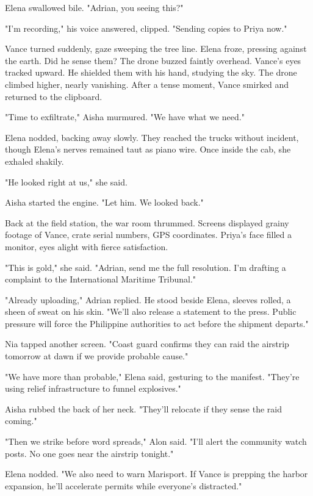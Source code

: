 Elena swallowed bile. "Adrian, you seeing this?"

"I'm recording," his voice answered, clipped. "Sending copies to Priya now."

Vance turned suddenly, gaze sweeping the tree line. Elena froze, pressing against the earth. Did he sense them? The drone buzzed faintly overhead. Vance's eyes tracked upward. He shielded them with his hand, studying the sky. The drone climbed higher, nearly vanishing. After a tense moment, Vance smirked and returned to the clipboard.

"Time to exfiltrate," Aisha murmured. "We have what we need."

Elena nodded, backing away slowly. They reached the trucks without incident, though Elena's nerves remained taut as piano wire. Once inside the cab, she exhaled shakily.

"He looked right at us," she said.

Aisha started the engine. "Let him. We looked back."

\bigskip

Back at the field station, the war room thrummed. Screens displayed grainy footage of Vance, crate serial numbers, GPS coordinates. Priya's face filled a monitor, eyes alight with fierce satisfaction.

"This is gold," she said. "Adrian, send me the full resolution. I'm drafting a complaint to the International Maritime Tribunal."

"Already uploading," Adrian replied. He stood beside Elena, sleeves rolled, a sheen of sweat on his skin. "We'll also release a statement to the press. Public pressure will force the Philippine authorities to act before the shipment departs."

Nia tapped another screen. "Coast guard confirms they can raid the airstrip tomorrow at dawn if we provide probable cause."

"We have more than probable," Elena said, gesturing to the manifest. "They're using relief infrastructure to funnel explosives."

Aisha rubbed the back of her neck. "They'll relocate if they sense the raid coming."

"Then we strike before word spreads," Alon said. "I'll alert the community watch posts. No one goes near the airstrip tonight."

Elena nodded. "We also need to warn Marisport. If Vance is prepping the harbor expansion, he'll accelerate permits while everyone's distracted."

